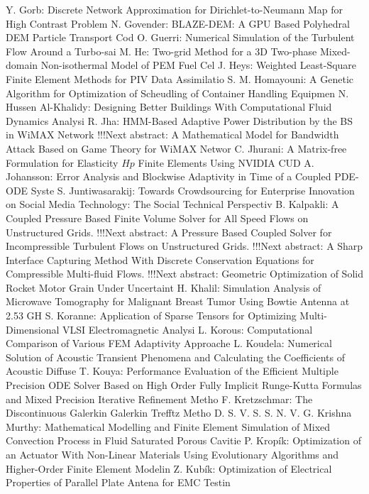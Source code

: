 \documentclass[10pt, A4]{article}%
\begin{document}
{Y. Gorb}: {Discrete Network Approximation for Dirichlet-to-Neumann Map for High Contrast Problem}
{N. Govender}: {BLAZE-DEM: A GPU Based Polyhedral DEM Particle Transport Cod}
{O. Guerri}: {Numerical Simulation of the Turbulent Flow Around a Turbo-sai}
{M. He}: {Two-grid Method for a 3D Two-phase Mixed-domain Non-isothermal Model of PEM Fuel Cel}
{J. Heys}: {Weighted Least-Square Finite Element Methods for PIV Data Assimilatio}
{S. M. Homayouni}: {A Genetic Algorithm for Optimization of Scheudling of Container Handling Equipmen}
{N. Hussen Al-Khalidy}: {Designing Better Buildings With Computational Fluid Dynamics Analysi}
{R. Jha}: {HMM-Based Adaptive Power Distribution by the BS in WiMAX Network      !!!Next abstract: A Mathematical Model for Bandwidth Attack Based on Game Theory for WiMAX Networ}
{C. Jhurani}: {A Matrix-free Formulation for Elasticity $Hp$ Finite Elements Using NVIDIA CUD}
{A. Johansson}: {Error Analysis and Blockwise Adaptivity in Time of a Coupled PDE-ODE Syste}
{S. Juntiwasarakij}: {Towards Crowdsourcing for Enterprise Innovation on Social Media Technology: The Social Technical Perspectiv}
{B. Kalpakli}: {A Coupled Pressure Based Finite Volume Solver for All Speed Flows on Unstructured Grids.      !!!Next abstract: A Pressure Based Coupled Solver for Incompressible Turbulent Flows on Unstructured Grids.      !!!Next abstract: A Sharp Interface Capturing Method With Discrete Conservation Equations for Compressible Multi-fluid Flows.      !!!Next abstract: Geometric Optimization of Solid Rocket Motor Grain Under Uncertaint}
{H. Khalil}: {Simulation Analysis of Microwave Tomography for Malignant Breast Tumor Using Bowtie Antenna at 2.53 GH}
{S. Koranne}: {Application of Sparse Tensors for Optimizing Multi-Dimensional VLSI Electromagnetic Analysi}
{L. Korous}: {Computational Comparison of Various FEM Adaptivity Approache}
{L. Koudela}: {Numerical Solution of Acoustic Transient Phenomena and Calculating the Coefficients of Acoustic Diffuse}
{T. Kouya}: {Performance Evaluation of the Efficient Multiple Precision ODE Solver Based on High Order Fully Implicit Runge-Kutta Formulas and Mixed Precision Iterative Refinement Metho}
{F. Kretzschmar}: {The Discontinuous Galerkin Galerkin Trefftz Metho}
{D. S. V. S. S. N. V. G. Krishna Murthy}: {Mathematical Modelling and Finite Element Simulation of Mixed Convection Process in Fluid Saturated Porous Cavitie}
{P. Kropík}: {Optimization of an Actuator With Non-Linear Materials Using Evolutionary Algorithms and Higher-Order Finite Element Modelin}
{Z. Kubík}: {Optimization of Electrical Properties of Parallel Plate Antena for EMC Testin}
\end{document}
